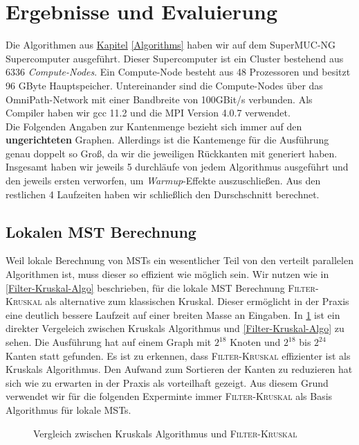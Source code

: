 \section{Ergebnisse und Evaluierung}\label{Evaluierung}
Die Algorithmen aus \hyperref[Algorithms]{Kapitel} \ref{Algorithms} haben wir auf dem SuperMUC-NG Supercomputer ausgeführt. Dieser Supercomputer ist ein Cluster bestehend aus 6336 \emph{Compute-Nodes}. Ein Compute-Node besteht aus 48 Prozessoren und besitzt 96 GByte Hauptspeicher. Untereinander sind die Compute-Nodes über das OmniPath-Network mit einer Bandbreite von 100GBit/s verbunden. Als Compiler haben wir gcc 11.2 und die MPI Version 4.0.7 verwendet.\\
 Die Folgenden Angaben zur Kantenmenge bezieht sich immer auf den \textbf{ungerichteten} Graphen. Allerdings ist die Kantemenge für die Ausführung genau doppelt so Groß, da wir die jeweiligen Rückkanten mit generiert haben. Insgesamt haben wir jeweils 5 durchläufe von jedem Algorithmus ausgeführt und den jeweils ersten verworfen, um \emph{Warmup}-Effekte auszuschließen. Aus den restlichen 4 Laufzeiten haben wir schließlich den Durschschnitt berechnet.

\subsection{Lokalen MST Berechnung}
Weil lokale Berechnung von MSTs ein wesentlicher Teil von den verteilt parallelen Algorithmen ist, muss dieser so effizient wie möglich sein. 
Wir nutzen wie in \cref{Filter-Kruskal-Algo} beschrieben, für die lokale MST Berechnung 
\textsc{Filter-Kruskal} als alternative zum klassischen Kruskal. Dieser ermöglicht in der Praxis eine deutlich bessere Laufzeit auf einer breiten Masse an Eingaben. 
In \cref{Filter-Kruskal-Img} ist ein direkter Vergeleich zwischen Kruskals Algorithmus und \cref{Filter-Kruskal-Algo} zu sehen. Die Ausführung hat auf einem Graph mit $2^{18}$ Knoten und $2^{18}$ bis $2^{24}$ Kanten statt gefunden.
Es ist zu erkennen, dass \textsc{Filter-Kruskal} effizienter ist als Kruskals Algorithmus. Den Aufwand zum Sortieren der Kanten zu reduzieren hat sich wie zu erwarten in der Praxis als vorteilhaft gezeigt.
Aus diesem Grund verwendet wir für die folgenden Experminte immer \textsc{Filter-Kruskal} als Basis Algorithmus für lokale MSTs.

\begin{figure}[H]
    \centering
    
    \caption{Vergleich zwischen Kruskals Algorithmus und \textsc{Filter-Kruskal}}
    \label{Filter-Kruskal-Img}
\end{figure}



